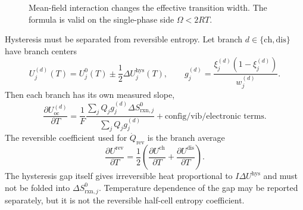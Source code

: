 \documentclass[11pt,a4paper]{article}
\newcommand{\rxn}{\mathrm{rxn}}
\newcommand{\rev}{\mathrm{rev}}
\newcommand{\oc}{\mathrm{oc}}
\newcommand{\eff}{\mathrm{eff}}
\newcommand{\hys}{\mathrm{hys}}
\begin{document}
\begin{figure}[t]
\centering
{}
\caption{Mean-field interaction changes the effective transition width. The formula is valid on the single-phase side $\Omega<2RT$.}
\label{fig:weff}
\end{figure}

Hysteresis must be separated from reversible entropy. Let branch $d\in\{\mathrm{ch},\mathrm{dis}\}$ have
branch centers
\begin{equation}
U_j^{(d)}(T)=U_j^0(T)\pm\frac{1}{2}\Delta U_j^{\hys}(T),
\qquad
g_j^{(d)}=\frac{\xi_j^{(d)}(1-\xi_j^{(d)})}{w_j^{(d)}}.
\label{eq:hyscenter}
\end{equation}
Then each branch has its own measured slope,
\begin{equation}
\frac{\partial U_\oc^{(d)}}{\partial T}
=\frac{1}{F}\frac{\sum_jQ_jg_j^{(d)}\Delta S^0_{\rxn,j}}
                 {\sum_jQ_jg_j^{(d)}}+\text{config/vib/electronic terms}.
\label{eq:hysbranch}
\end{equation}
The reversible coefficient used for $\dot Q_\rev$ is the branch average
\begin{equation}
\frac{\partial U^{\rev}}{\partial T}
=\frac{1}{2}\left(\frac{\partial U^{\mathrm{ch}}}{\partial T}
                 +\frac{\partial U^{\mathrm{dis}}}{\partial T}\right).
\label{eq:hysavg}
\end{equation}
The hysteresis gap itself gives irreversible heat proportional to $I\Delta U^{\hys}$ and must not be folded into
$\Delta S^0_{\rxn,j}$. Temperature dependence of the gap may be reported separately, but it is not the reversible
half-cell entropy coefficient.
\end{document}
